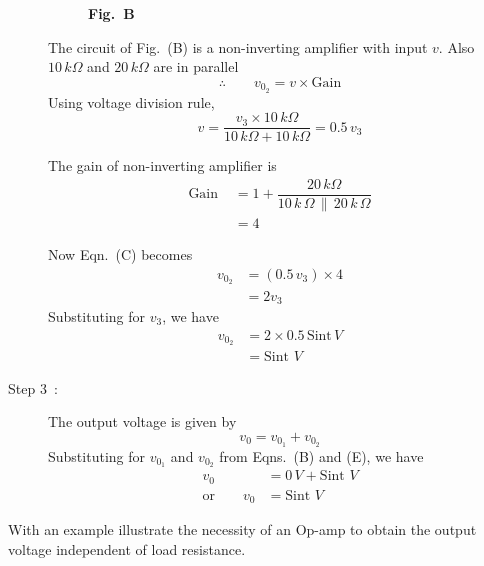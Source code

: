 \begin{solution}
\begin{description}
\begin{figure}[H]
\smallskip
\medskip
{\bf Fig.~B}
\end{figure}

The circuit of Fig.~(B) is a non-inverting amplifier with input $v$. Also $10\,k\Omega$ and $20\,k\Omega$ are in parallel
\begin{equation*}
\therefore\qquad v_{0_{2}}=v\times \text{Gain}\tag{C}
\end{equation*}
Using voltage division rule,
\begin{equation*}
v=\dfrac{v_{3}\times 10\,k\Omega}{10\,k\Omega+10\,k\Omega}=0.5\, v_{3}\tag{D}
\end{equation*}

The gain of non-inverting amplifier is
\begin{align*}
\text{Gain~} &= 1+\dfrac{20\,k\Omega}{10\,k\,\Omega\, \|\, 20\,k\,\Omega}\\[4pt]
&= 4
\end{align*}

Now Eqn.~(C) becomes
\begin{align*}
v_{0_{2}} &= (0.5\,v_{3})\times 4\\[4pt]
&= 2v_{3}
\end{align*}
Substituting for $v_{3}$, we have
\begin{align*}
v_{0_{2}} &= 2\times 0.5\,\text{Sint}\, V\\[4pt]
&= \text{Sint~}V\tag{E}
\end{align*}

\item[Step 3~:] The output voltage is given by
$$
v_{0}=v_{0_{1}}+v_{0_{2}}
$$
Substituting for $v_{0_{1}}$ and $v_{0_{2}}$ from Eqns.~(B) and (E), we have
\begin{align*}
v_{0} &= 0\,V+\text{Sint~}V\\[4pt]
\text{or}\qquad v_{0} &=\text{Sint~}V\tag{F}
\end{align*}
\end{description}
\end{solution}

\begin{example}
With an example illustrate the necessity of an Op-amp to obtain the output voltage independent of load resistance.
\end{example}

